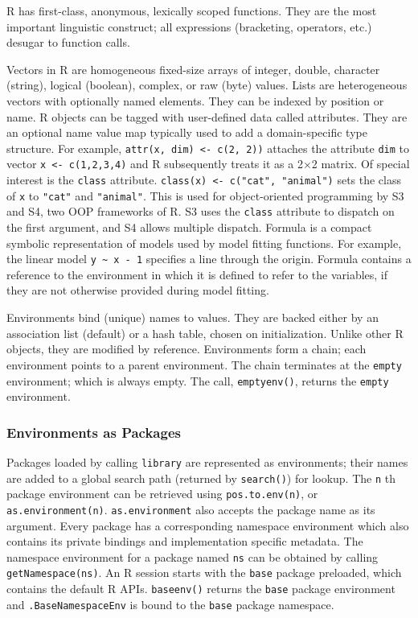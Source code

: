 \documentclass[10pt,review,sigplan,anonymous=true,authorversion=true,nonacm=true]{acmart}
\newcommand{\code}[1]{\lstinline |#1|\xspace}
\newcommand{\asEnvironment}{\code{as.environment}}
\begin{document}
R has first-class, anonymous, lexically scoped functions. They are the most
important linguistic construct; all expressions (bracketing, operators, etc.)
desugar to function calls.

Vectors in R are homogeneous fixed-size arrays of integer, double, character
(string), logical (boolean), complex, or raw (byte) values. Lists are
heterogeneous vectors with optionally named elements. They can be indexed by
position or name. R objects can be tagged with user-defined data called
attributes. They are an optional name value map typically used to add a
domain-specific type structure. For example, \code{attr(x, dim) <- c(2, 2))}
attaches the attribute \code{dim} to vector \code{x <- c(1,2,3,4)} and R
subsequently treats it as a 2$\times$2 matrix. Of special interest is the
\code{class} attribute. \code{class(x) <- c("cat", "animal")} sets the class of
\code{x} to \code{"cat"} and \code{"animal"}. This is used for object-oriented
programming by S3 and S4, two OOP frameworks of R. S3 uses the \code{class}
attribute to dispatch on the first argument, and S4 allows multiple dispatch.
Formula is a compact symbolic representation of models used by model fitting
functions. For example, the linear model \code{y ~ x - 1} specifies a line
through the origin. Formula contains a reference to the environment in which it
is defined to refer to the variables, if they are not otherwise provided during
model fitting.

Environments bind (unique) names to values. They are backed either by an
association list (default) or a hash table, chosen on initialization. Unlike
other R objects, they are modified by reference. Environments form a chain; each
environment points to a parent environment. The chain terminates at the
\code{empty} environment; which is always empty. The call, \code{emptyenv()},
returns the \code{empty} environment.

\subsubsection{Environments as Packages}

Packages loaded by calling \code{library} are represented as environments; their
names are added to a global search path (returned by \code{search()}) for
lookup. The \code{n}th package environment can be retrieved using
\code{pos.to.env(n)}, or \code{as.environment(n)}. \asEnvironment also accepts
the package name as its argument. Every package has a corresponding namespace
environment which also contains its private bindings and implementation specific
metadata. The namespace environment for a package named \code{ns} can be
obtained by calling \code{getNamespace(ns)}. An R session starts with the
\code{base} package preloaded, which contains the default R APIs.
\code{baseenv()} returns the \code{base} package environment and
\code{.BaseNamespaceEnv} is bound to the \code{base} package namespace.
\end{document}
